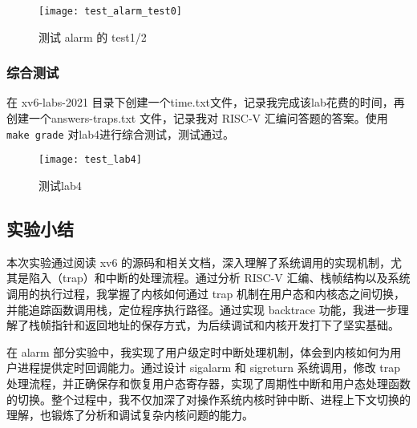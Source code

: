 \begin{figure}[!htb]
	\centering
	\texttt{[image: test\_alarm\_test0]}
	\caption{测试 alarm 的 test1/2}
	\label{fig:test_alarm_test1_and_test2}
\end{figure}

\subsubsection{综合测试}

在 xv6-labs-2021 目录下创建一个time.txt文件，记录我完成该lab花费的时间，再创建一个answers-traps.txt 文件，记录我对 RISC-V 汇编问答题的答案。使用 \texttt{make grade} 对lab4进行综合测试，测试通过。

\begin{figure}[!htb]
	\centering
	\texttt{[image: test\_lab4]}
	\caption{测试lab4}
	\label{fig:test_lab4}
\end{figure}


\subsection{实验小结}

本次实验通过阅读 xv6 的源码和相关文档，深入理解了系统调用的实现机制，尤其是陷入（trap）和中断的处理流程。通过分析 RISC-V 汇编、栈帧结构以及系统调用的执行过程，我掌握了内核如何通过 trap 机制在用户态和内核态之间切换，并能追踪函数调用栈，定位程序执行路径。通过实现 backtrace 功能，我进一步理解了栈帧指针和返回地址的保存方式，为后续调试和内核开发打下了坚实基础。

在 alarm 部分实验中，我实现了用户级定时中断处理机制，体会到内核如何为用户进程提供定时回调能力。通过设计 sigalarm 和 sigreturn 系统调用，修改 trap 处理流程，并正确保存和恢复用户态寄存器，实现了周期性中断和用户态处理函数的切换。整个过程中，我不仅加深了对操作系统内核时钟中断、进程上下文切换的理解，也锻炼了分析和调试复杂内核问题的能力。